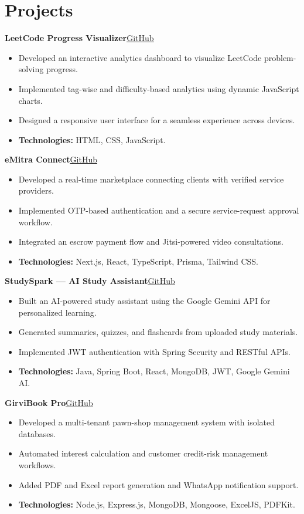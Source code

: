 \documentclass[10pt,a4paper]{article}
\newcommand{\project}[2]{%
  \textbf{#1}\hfill\href{#2}{\underline{GitHub}}\\[-2pt]
}
\begin{document}
\section{Projects}
{\small
\project{LeetCode Progress Visualizer}{https://github.com/aaditya-loops}
\begin{itemize}
  \item Developed an interactive analytics dashboard to visualize LeetCode problem-solving progress.
  \item Implemented tag-wise and difficulty-based analytics using dynamic JavaScript charts.
  \item Designed a responsive user interface for a seamless experience across devices.
  \item \textbf{Technologies:} HTML, CSS, JavaScript.
\end{itemize}
\vspace{1pt}

\project{eMitra Connect}{https://github.com/aaditya-loops/econnect}
\begin{itemize}
  \item Developed a real-time marketplace connecting clients with verified service providers.
  \item Implemented OTP-based authentication and a secure service-request approval workflow.
  \item Integrated an escrow payment flow and Jitsi-powered video consultations.
  \item \textbf{Technologies:} Next.js, React, TypeScript, Prisma, Tailwind CSS.
\end{itemize}
\vspace{1pt}

\project{StudySpark --- AI Study Assistant}{https://github.com/aaditya-loops/ai-study-assistant}
\begin{itemize}
  \item Built an AI-powered study assistant using the Google Gemini API for personalized learning.
  \item Generated summaries, quizzes, and flashcards from uploaded study materials.
  \item Implemented JWT authentication with Spring Security and RESTful APIs.
  \item \textbf{Technologies:} Java, Spring Boot, React, MongoDB, JWT, Google Gemini AI.
\end{itemize}
\vspace{1pt}

\project{GirviBook Pro}{https://github.com/aaditya-loops/GirviBook-Pro}
\begin{itemize}
  \item Developed a multi-tenant pawn-shop management system with isolated databases.
  \item Automated interest calculation and customer credit-risk management workflows.
  \item Added PDF and Excel report generation and WhatsApp notification support.
  \item \textbf{Technologies:} Node.js, Express.js, MongoDB, Mongoose, ExcelJS, PDFKit.
\end{itemize}
}
\end{document}
